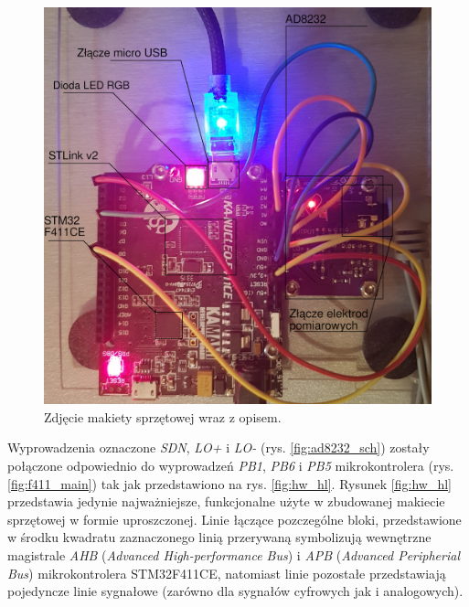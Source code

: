 \begin{figure}[h!]
    \centering 
    \includegraphics[scale=0.9]{pl/media/devimg.jpg}
    \caption{Zdjęcie makiety sprzętowej wraz z opisem.}
    \label{fig:devimg}
\end{figure}

Wyprowadzenia oznaczone \textit{SDN}, \textit{LO+} i \textit{LO-} (rys. \ref{fig:ad8232_sch}) zostały połączone odpowiednio 
do wyprowadzeń \textit{PB1}, \textit{PB6} i \textit{PB5} mikrokontrolera (rys. \ref{fig:f411_main}) tak jak przedstawiono na
rys. \ref{fig:hw_hl}. Rysunek \ref{fig:hw_hl} przedstawia jedynie najważniejsze, funkcjonalne użyte w zbudowanej 
makiecie sprzętowej w formie uproszczonej. Linie łączące pozczególne bloki, przedstawione w środku kwadratu zaznaczonego 
linią przerywaną symbolizują wewnętrzne magistrale \textit{AHB} (\textit{Advanced High-performance Bus}) i 
\textit{APB} (\textit{Advanced Peripherial Bus}) mikrokontrolera STM32F411CE, natomiast linie pozostałe przedstawiają pojedyncze
linie sygnałowe (zarówno dla sygnałów cyfrowych jak i analogowych).

